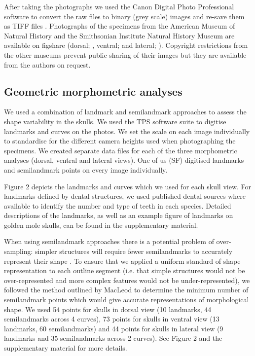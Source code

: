 \documentclass[12pt,a4paper]{article}
\begin{document}
	After taking the photographs we used the Canon Digital Photo Professional software \citep{DPP2013} to convert the raw files to binary (grey scale) images and re-save them as TIFF files \citep[uncompressed files preserve greater detail, ][]{RHOI2013}. Photographs of the specimens from the American Museum of Natural History and the Smithsonian Institute Natural History Museum are available on figshare (dorsal; \citet{Finlay2013d}, ventral; \citet{Finlay2013v} and lateral; \citet{Finlay2013l}). Copyright restrictions from the other museums prevent public sharing of their images but they are available from the authors on request.

\subsection{Geometric morphometric analyses}

	We used a combination of landmark and semilandmark approaches to assess the shape variability in the skulls.  We used the TPS software suite \citep{Rohlf2013} to digitise landmarks and curves on the photos. We set the scale on each image individually to standardise for the different camera heights used when photographing the specimens. We created separate data files for each of the three morphometric analyses (dorsal, ventral and lateral views). One of us (SF) digitised landmarks and semilandmark points on every image individually. 

	Figure 2 depicts the landmarks and curves which we used for each skull view. For landmarks defined by dental structures, we used published dental sources where available \citep{Repenning1967, Eisenberg1969, Nowak1983, MacPhee1987, KnoxJones1992, Davis1997, Querouil2001, Nagorsen2002, Wilson2005, Goodman2006, Karatas2007, Hoffmann2008, Asher2008,  Muldoon2009, Lin2010}  to identify the number and type of teeth in each species. Detailed descriptions of the landmarks, as well as an example figure of landmarks on golden mole skulls, can be found in the supplementary material.

	When using semilandmark approaches there is a potential problem of over-sampling: simpler structures will require fewer semilandmarks to accurately represent their shape \citep{MacLeod2012}. To ensure that we applied a uniform standard of shape representation to each outline segment (i.e. that simple structures would not be over-represented and more complex features would not be under-represented), we followed the method outlined by MacLeod \citeyearpar{MacLeod2012} to determine the minimum number of semilandmark points which would give accurate representations of morphological shape. We used 54 points for skulls in dorsal view (10 landmarks, 44 semilandmarks across 4 curves), 73 points for skulls in ventral view (13 landmarks, 60 semilandmarks) and 44 points for skulls in lateral view (9 landmarks and 35 semilandmarks across 2 curves). See Figure 2 and the supplementary material for more details.
	
\end{document}
